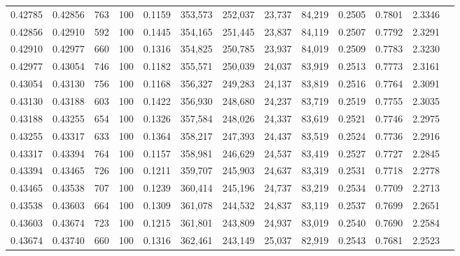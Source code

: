 \begin{tabular}{rrrrrrrrrrrrr}
0.42785 & 0.42856 &   763 & 100 &                                     0.1159 & 353,573 & 252,037 &  23,737 &  84,219 & 0.2505 & 0.7801 & 2.3346 \\
0.42856 & 0.42910 &   592 & 100 &                                     0.1445 & 354,165 & 251,445 &  23,837 &  84,119 & 0.2507 & 0.7792 & 2.3291 \\
0.42910 & 0.42977 &   660 & 100 &                                     0.1316 & 354,825 & 250,785 &  23,937 &  84,019 & 0.2509 & 0.7783 & 2.3230 \\
0.42977 & 0.43054 &   746 & 100 &                                     0.1182 & 355,571 & 250,039 &  24,037 &  83,919 & 0.2513 & 0.7773 & 2.3161 \\
0.43054 & 0.43130 &   756 & 100 &                                     0.1168 & 356,327 & 249,283 &  24,137 &  83,819 & 0.2516 & 0.7764 & 2.3091 \\
0.43130 & 0.43188 &   603 & 100 &                                     0.1422 & 356,930 & 248,680 &  24,237 &  83,719 & 0.2519 & 0.7755 & 2.3035 \\
0.43188 & 0.43255 &   654 & 100 &                                     0.1326 & 357,584 & 248,026 &  24,337 &  83,619 & 0.2521 & 0.7746 & 2.2975 \\
0.43255 & 0.43317 &   633 & 100 &                                     0.1364 & 358,217 & 247,393 &  24,437 &  83,519 & 0.2524 & 0.7736 & 2.2916 \\
0.43317 & 0.43394 &   764 & 100 &                                     0.1157 & 358,981 & 246,629 &  24,537 &  83,419 & 0.2527 & 0.7727 & 2.2845 \\
0.43394 & 0.43465 &   726 & 100 &                                     0.1211 & 359,707 & 245,903 &  24,637 &  83,319 & 0.2531 & 0.7718 & 2.2778 \\
0.43465 & 0.43538 &   707 & 100 &                                     0.1239 & 360,414 & 245,196 &  24,737 &  83,219 & 0.2534 & 0.7709 & 2.2713 \\
0.43538 & 0.43603 &   664 & 100 &                                     0.1309 & 361,078 & 244,532 &  24,837 &  83,119 & 0.2537 & 0.7699 & 2.2651 \\
0.43603 & 0.43674 &   723 & 100 &                                     0.1215 & 361,801 & 243,809 &  24,937 &  83,019 & 0.2540 & 0.7690 & 2.2584 \\
0.43674 & 0.43740 &   660 & 100 &                                     0.1316 & 362,461 & 243,149 &  25,037 &  82,919 & 0.2543 & 0.7681 & 2.2523 \\

\end{tabular}
